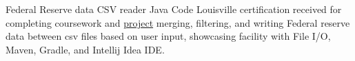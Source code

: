 {Federal Reserve data CSV reader}
{Java}
{Code Louisville certification received for completing coursework and \href{https://github.com/jacobarchambault/codeloujava}{project} merging, filtering, and writing Federal reserve data between csv files based on user input, showcasing facility with 
	File I/O, Maven, Gradle, and Intellij Idea IDE.}
